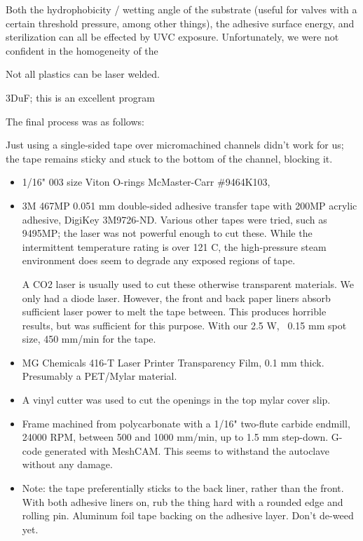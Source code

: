 \documentclass[paper.tex]{subfiles}
\begin{document}
Both the hydrophobicity / wetting angle of the substrate (useful for valves with a certain threshold pressure, among other things), the adhesive surface energy, and sterilization can all be effected by UVC exposure. Unfortunately, we were not confident in the homogeneity of the 

Not all plastics can be laser welded.

3DuF; this is an excellent program 



The final process was as follows:

Just using a single-sided tape over micromachined channels didn't work for us; the tape remains sticky and stuck to the bottom of the channel, blocking it.

\begin{itemize}
	\item 1/16" 003 size Viton O-rings McMaster-Carr \#9464K103, 
	\item 3M 467MP 0.051 mm double-sided adhesive transfer tape with 200MP acrylic adhesive, DigiKey 3M9726-ND.
	Various other tapes were tried, such as 9495MP; the laser was not powerful enough to cut these.
	While the intermittent temperature rating is over 121 C, the high-pressure steam environment does seem to degrade any exposed regions of tape.
	
	A CO2 laser is usually used to cut these otherwise transparent materials. We only had a diode laser. However, the front and back paper liners absorb sufficient laser power to melt the tape between. This produces horrible results, but was sufficient for this purpose. With our 2.5 W, ~0.15 mm spot size, 450 mm/min for the tape.
	
	\item MG Chemicals 416-T Laser Printer Transparency Film, 0.1 mm thick. Presumably a PET/Mylar material.
	
	\item A vinyl cutter was used to cut the openings in the top mylar cover slip.
	\item Frame machined from polycarbonate with a 1/16" two-flute carbide endmill, 24000 RPM, between 500 and 1000 mm/min, up to 1.5 mm step-down. G-code generated with MeshCAM. This seems to withstand the autoclave without any damage.
	\item Note: the tape preferentially sticks to the back liner, rather than the front.
	With both adhesive liners on, rub the thing hard with a rounded edge and rolling pin.
	Aluminum foil tape backing on the adhesive layer.
	Don't de-weed yet. 
	
	
\end{itemize}
\end{document}
